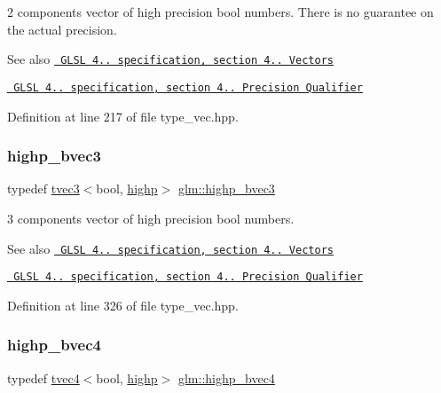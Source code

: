 2 components vector of high precision bool numbers. There is no guarantee on the actual precision.

\begin{DoxySeeAlso}{See also}
\href{http://www.opengl.org/registry/doc/GLSLangSpec.4.20.8.pdf}{\texttt{ G\+L\+SL 4.. specification, section 4.. Vectors}} 

\href{http://www.opengl.org/registry/doc/GLSLangSpec.4.20.8.pdf}{\texttt{ G\+L\+SL 4.. specification, section 4.. Precision Qualifier}} 
\end{DoxySeeAlso}


Definition at line 217 of file type\+\_\+vec.\+hpp.

\mbox{\label{group__core__precision_gac35c0ff5b9eead09e905b4aa09d1e954}} 
\subsubsection{\texorpdfstring{highp\_bvec3}{highp\_bvec3}}
{\footnotesize\ttfamily typedef \mbox{\hyperlink{structglm_1_1tvec3}{tvec3}}$<$bool, \mbox{\hyperlink{namespaceglm_a0f04f086094c747d227af4425893f545ac6f7eab42eacbb10d59a58e95e362074}{highp}}$>$ \mbox{\hyperlink{group__core__precision_gac35c0ff5b9eead09e905b4aa09d1e954}{glm\+::highp\+\_\+bvec3}}}

3 components vector of high precision bool numbers.

\begin{DoxySeeAlso}{See also}
\href{http://www.opengl.org/registry/doc/GLSLangSpec.4.20.8.pdf}{\texttt{ G\+L\+SL 4.. specification, section 4.. Vectors}} 

\href{http://www.opengl.org/registry/doc/GLSLangSpec.4.20.8.pdf}{\texttt{ G\+L\+SL 4.. specification, section 4.. Precision Qualifier}} 
\end{DoxySeeAlso}


Definition at line 326 of file type\+\_\+vec.\+hpp.

\mbox{\label{group__core__precision_ga12155cf93fb8fea5d9c4c7e2d72aed4e}} 
\subsubsection{\texorpdfstring{highp\_bvec4}{highp\_bvec4}}
{\footnotesize\ttfamily typedef \mbox{\hyperlink{structglm_1_1tvec4}{tvec4}}$<$bool, \mbox{\hyperlink{namespaceglm_a0f04f086094c747d227af4425893f545ac6f7eab42eacbb10d59a58e95e362074}{highp}}$>$ \mbox{\hyperlink{group__core__precision_ga12155cf93fb8fea5d9c4c7e2d72aed4e}{glm\+::highp\+\_\+bvec4}}}

